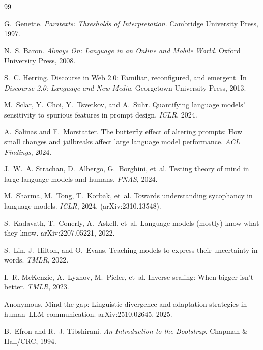 \documentclass[10pt, letterpaper]{article}
\begin{document}
\begin{thebibliography}{99}

G.~Genette.
\newblock \emph{Paratexts: Thresholds of Interpretation}.
\newblock Cambridge University Press, 1997.

N.~S. Baron.
\newblock \emph{Always On: Language in an Online and Mobile World}.
\newblock Oxford University Press, 2008.

S.~C. Herring.
\newblock Discourse in Web 2.0: Familiar, reconfigured, and emergent.
\newblock In \emph{Discourse 2.0: Language and New Media}. Georgetown University Press, 2013.

M.~Sclar, Y.~Choi, Y.~Tsvetkov, and A.~Suhr.
\newblock Quantifying language models' sensitivity to spurious features in prompt design.
\newblock \emph{ICLR}, 2024.

A.~Salinas and F.~Morstatter.
\newblock The butterfly effect of altering prompts: How small changes and jailbreaks affect large language model performance.
\newblock \emph{ACL Findings}, 2024.

J.~W.~A. Strachan, D.~Albergo, G.~Borghini, et~al.
\newblock Testing theory of mind in large language models and humans.
\newblock \emph{PNAS}, 2024.

M.~Sharma, M.~Tong, T.~Korbak, et~al.
\newblock Towards understanding sycophancy in language models.
\newblock \emph{ICLR}, 2024. (arXiv:2310.13548).

S.~Kadavath, T.~Conerly, A.~Askell, et~al.
\newblock Language models (mostly) know what they know.
\newblock arXiv:2207.05221, 2022.

S.~Lin, J.~Hilton, and O.~Evans.
\newblock Teaching models to express their uncertainty in words.
\newblock \emph{TMLR}, 2022.

I.~R. McKenzie, A.~Lyzhov, M.~Pieler, et~al.
\newblock Inverse scaling: When bigger isn't better.
\newblock \emph{TMLR}, 2023.

Anonymous.
\newblock Mind the gap: Linguistic divergence and adaptation strategies in human--LLM communication.
\newblock arXiv:2510.02645, 2025.

B.~Efron and R.~J. Tibshirani.
\newblock \emph{An Introduction to the Bootstrap}.
\newblock Chapman \& Hall/CRC, 1994.

\end{thebibliography}
\end{document}
